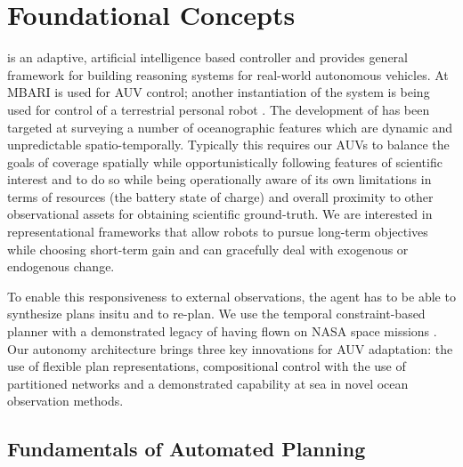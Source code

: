 \section{Foundational Concepts}
\label{sec:concepts}

\rx is an adaptive, artificial intelligence based controller and
provides general framework for building reasoning systems for
real-world autonomous vehicles. At MBARI \rx is used for AUV control;
another instantiation of the system is being used for control of a
terrestrial personal robot \cite{pr2, Meeussen:2010dn}. The
development of \rx has been targeted at surveying a number of
oceanographic features which are dynamic and unpredictable
spatio-temporally. Typically this requires our AUVs to balance the
goals of coverage spatially while opportunistically following features
of scientific interest and to do so while being operationally aware of
its own limitations in terms of resources (\eg the battery state of
charge) and overall proximity to other observational assets for
obtaining scientific ground-truth. We are interested in
representational frameworks that allow robots to pursue long-term
objectives while choosing short-term gain and can gracefully deal with
exogenous or endogenous change.

To enable this responsiveness to external observations, the agent has
to be able to synthesize plans insitu and to re-plan. We use the
temporal constraint-based planner \eu with a demonstrated legacy of
having flown on NASA space missions \cite{mus98,jonsson00,bresina05,
  barreiro09}. Our autonomy architecture brings three key innovations
for AUV adaptation: the use of flexible plan representations,
compositional control with the use of partitioned networks and a
demonstrated capability at sea in novel ocean observation methods.




\subsection{Fundamentals of  Automated Planning}
\label{sec:planningfound}

